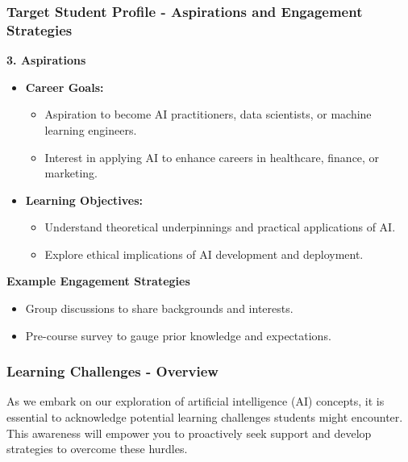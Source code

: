 \documentclass[aspectratio=169]{beamer}
\begin{document}
\begin{frame}[fragile]
    \frametitle{Target Student Profile - Aspirations and Engagement Strategies}
    \textbf{3. Aspirations}
    \begin{itemize}
        \item \textbf{Career Goals:}
        \begin{itemize}
            \item Aspiration to become AI practitioners, data scientists, or machine learning engineers.
            \item Interest in applying AI to enhance careers in healthcare, finance, or marketing.
        \end{itemize}
        \item \textbf{Learning Objectives:}
        \begin{itemize}
            \item Understand theoretical underpinnings and practical applications of AI.
            \item Explore ethical implications of AI development and deployment.
        \end{itemize}
    \end{itemize}
    
    \textbf{Example Engagement Strategies}
    \begin{itemize}
        \item Group discussions to share backgrounds and interests.
        \item Pre-course survey to gauge prior knowledge and expectations.
    \end{itemize}
\end{frame}

\begin{frame}[fragile]
    \frametitle{Learning Challenges - Overview}
    As we embark on our exploration of artificial intelligence (AI) concepts, it is essential to acknowledge potential learning challenges students might encounter. This awareness will empower you to proactively seek support and develop strategies to overcome these hurdles.
\end{frame}
\end{document}
